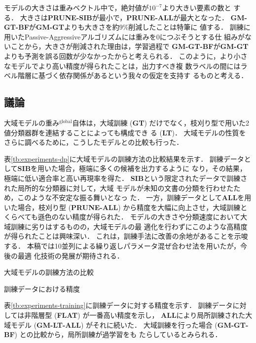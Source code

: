\documentclass[japanese]{jnlp_1.4}
\newcommand{\vect}[1]{}
\begin{document}
モデルの大きさは重みベクトル中で，絶対値が$10^{-7}$より大きい要素の数と
する．
大きさは{\bf PRUNE-SIB}が最小で，{\bf PRUNE-ALL}が最大となった．
{\bf GM-GT-BF}が{\bf GM-GT}よりも大きさを約9\%削減したことは特筆に
値する．
訓練に用いたPassive-Aggressiveアルゴリズムには重みを0につぶそうとする仕
組みがないことから，大きさが削減された理由は，学習過程で{\bf
GM-GT-BF}が{\bf GM-GT}よりも予測を誤る回数が少なかったからと考えられる．
このように，より小さなモデルでより高い精度が得られたことは，出力すべき複
数ラベルの間にはラベル階層に基づく依存関係があるという我々の仮定を支持す
るものと考える．


\subsection{議論}
\label{sec:discussion}

大域モデルの重み$\vect{w}^{\mathrm{global}}$自体は，大域訓練 ({\bf GT})
だけでなく，枝刈り型で用いた2値分類器群を連結することによっても構成でき
る ({\bf LT})．
大域モデルの性質をさらに調べるために，こうしたモデルとの比較も行った．



表\ref{tb:experiments-dp}に大域モデルの訓練方法の比較結果を示す．
訓練データとして{\bf SIB}を用いた場合，極端に多くの候補を出力するように
なり，その結果，極端に低い適合率と高い再現率を得た．
{\bf SIB}という限定されたデータで訓練された局所的な分類器に対して，大域
モデルが未知の文書の分類を行わせたため，このような不安定な振る舞いとなっ
た．
一方，訓練データとして{\bf ALL}を用いた場合，枝刈り型 ({\bf PRUNE-ALL})
から精度を大幅に向上させ，大域訓練とくらべても遜色のない精度が得られた．
モデルの大きさや分類速度において大域訓練に劣りはするものの，大域モデルの最
適化を行わずにこのような高精度が得られたことは興味深い．
これは，訓練手法に改善の余地があることを示唆する．
本稿では10並列による繰り返しパラメータ混ぜ合わせ法を用いたが，今後の最適
化技術の発展が期待される．


\begin{table}[b]
\vspace*{-1\Cvs}
  \caption{大域モデルの訓練方法の比較}
  \label{tb:experiments-dp}

\end{table}
\begin{table}[b]
  \caption{訓練データにおける精度}
  \label{tb:experiments-training}

\end{table}


表\ref{tb:experiments-training}に訓練データに対する精度を示す．
訓練データに対しては非階層型 ({\bf FLAT}) が一番高い精度を示し，{\bf
ALL}により局所訓練された大域モデル ({\bf GM-LT-ALL}) がそれに続いた．
大域訓練を行った場合 ({\bf GM-GT-BF}) との比較から，局所訓練が過学習をも
たらしているとみられる．
\end{document}
